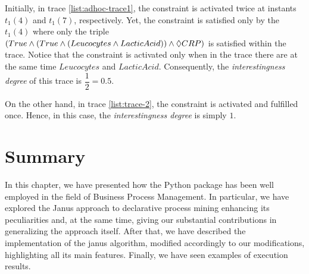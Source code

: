 \begin{example}
Initially, in trace \ref{list:adhoc-trace1}, the constraint is activated twice at instants $t_1(4)$ and $t_1(7)$, respectively. Yet, the constraint is satisfied only by the $t_1(4)$ where only the triple $(True \wedge (True \wedge (Leucocytes \wedge LacticAcid)) \wedge \Diamond CRP)$ is satisfied within the trace. Notice that the constraint is activated only when in the trace there are at the same time $Leucocytes$ and $LacticAcid$. Consequently, the \textit{interestingness degree} of this trace is $\dfrac{1}{2} = 0.5$.

On the other hand, in trace \ref{list:trace-2}, the constraint is activated and fulfilled once. Hence, in this case, the \textit{interestingness degree} is simply $1$.
\end{example}

\section{Summary}
In this chapter, we have presented how the \LTLfToDFA Python package has been well employed in the field of Business Process Management. In particular, we have explored the Janus approach to declarative process mining enhancing its peculiarities and, at the same time, giving our substantial contributions in generalizing the approach itself. After that, we have described the implementation of the janus algorithm, modified accordingly to our modifications, highlighting all its main features. Finally, we have seen examples of execution results.
















